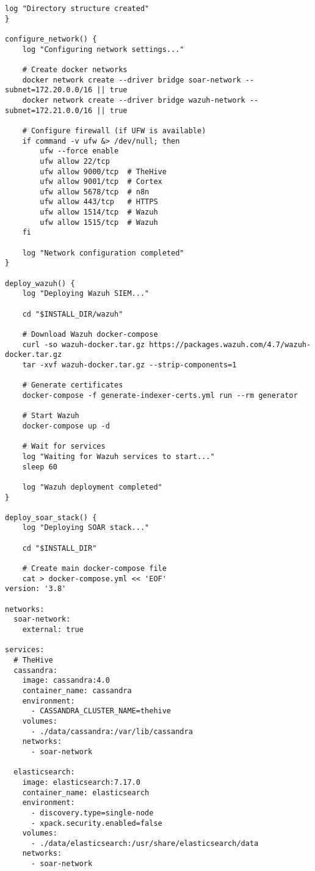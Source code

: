 \begin{lstlisting}[style=bashstyle,caption=Script d'installation complete de la stack SOAR]
    log "Directory structure created"
}

configure_network() {
    log "Configuring network settings..."
    
    # Create docker networks
    docker network create --driver bridge soar-network --subnet=172.20.0.0/16 || true
    docker network create --driver bridge wazuh-network --subnet=172.21.0.0/16 || true
    
    # Configure firewall (if UFW is available)
    if command -v ufw &> /dev/null; then
        ufw --force enable
        ufw allow 22/tcp
        ufw allow 9000/tcp  # TheHive
        ufw allow 9001/tcp  # Cortex
        ufw allow 5678/tcp  # n8n
        ufw allow 443/tcp   # HTTPS
        ufw allow 1514/tcp  # Wazuh
        ufw allow 1515/tcp  # Wazuh
    fi
    
    log "Network configuration completed"
}

deploy_wazuh() {
    log "Deploying Wazuh SIEM..."
    
    cd "$INSTALL_DIR/wazuh"
    
    # Download Wazuh docker-compose
    curl -so wazuh-docker.tar.gz https://packages.wazuh.com/4.7/wazuh-docker.tar.gz
    tar -xvf wazuh-docker.tar.gz --strip-components=1
    
    # Generate certificates
    docker-compose -f generate-indexer-certs.yml run --rm generator
    
    # Start Wazuh
    docker-compose up -d
    
    # Wait for services
    log "Waiting for Wazuh services to start..."
    sleep 60
    
    log "Wazuh deployment completed"
}

deploy_soar_stack() {
    log "Deploying SOAR stack..."
    
    cd "$INSTALL_DIR"
    
    # Create main docker-compose file
    cat > docker-compose.yml << 'EOF'
version: '3.8'

networks:
  soar-network:
    external: true

services:
  # TheHive
  cassandra:
    image: cassandra:4.0
    container_name: cassandra
    environment:
      - CASSANDRA_CLUSTER_NAME=thehive
    volumes:
      - ./data/cassandra:/var/lib/cassandra
    networks:
      - soar-network

  elasticsearch:
    image: elasticsearch:7.17.0
    container_name: elasticsearch
    environment:
      - discovery.type=single-node
      - xpack.security.enabled=false
    volumes:
      - ./data/elasticsearch:/usr/share/elasticsearch/data
    networks:
      - soar-network


\end{lstlisting}
